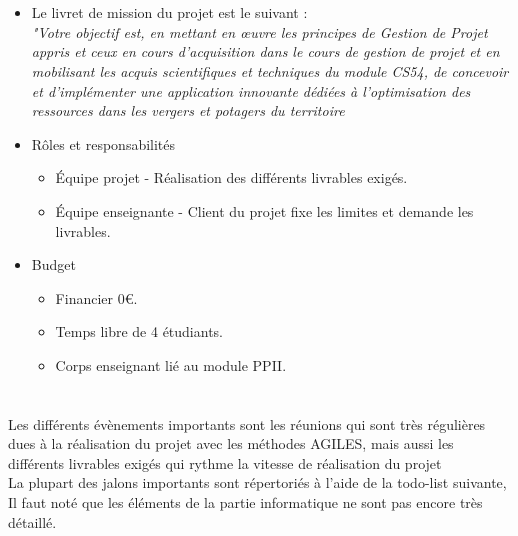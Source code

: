 \documentclass{report}
\begin{document}
\section*{\color{orange}{\Large Organisation / ressources, budget}}
\begin{itemize}
    \item Le livret de mission du projet est le suivant : \\ 
    \textit{"Votre objectif est, en mettant en œuvre les principes de Gestion de Projet appris et
    ceux en cours d’acquisition dans le cours de gestion de projet et en mobilisant les acquis
    scientifiques et techniques du module CS54, de concevoir et d’implémenter une application
    innovante dédiées à l’optimisation des ressources dans les vergers et potagers du territoire}
    \item Rôles et responsabilités
    \begin{itemize}
        \item Équipe projet - Réalisation des différents livrables exigés.
        \item Équipe enseignante - Client du projet fixe les limites et demande les livrables.
    \end{itemize}
    \item Budget
    \begin{itemize}
        \item Financier 0€.
        \item Temps libre de 4 étudiants.
        \item Corps enseignant lié au module PPII.
    \end{itemize}
    
\end{itemize}
\section*{\color{orange}{\Large Jalons : échéancier / évènements importants }}
Les différents évènements importants sont les réunions qui sont très régulières dues à la réalisation du projet avec les méthodes AGILES, mais aussi les différents livrables exigés qui rythme la vitesse de réalisation du projet
\vspace{0.5cm} \\
La plupart des jalons importants sont répertoriés à l'aide de la todo-list suivante, Il faut noté que les éléments de la partie informatique ne sont pas encore très détaillé.
\end{document}
